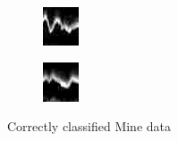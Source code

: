 \documentclass[english, 12pt]{article}
\begin{document}
\begin{figure}[H]
\begin{subfigure}[b]{0.2\textwidth}
        \caption{}
    \end{subfigure}
    \begin{subfigure}[b]{0.2\textwidth}
        \includegraphics[width=\textwidth]{CC03.jpg}
        \caption{}
    \end{subfigure}
    \begin{subfigure}[b]{0.2\textwidth}
        \includegraphics[width=\textwidth]{CC04.jpg}
        \caption{}
    \end{subfigure}
    \caption{Correctly classified Mine data}\label{fig:cc0}
\end{figure}
\end{document}
